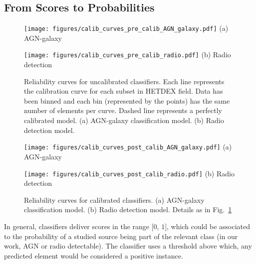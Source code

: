 \documentclass{aa}
\begin{document}
\begin{appendix}
\section{From Scores to Probabilities}\label{app:calibration_models}

\begin{figure}
  \centering
  \begin{minipage}{0.24\textwidth}
    \centering
    \texttt{[image: figures/calib\_curves\_pre\_calib\_AGN\_galaxy.pdf]}\hfill\break%
    {(a) AGN-galaxy}
  \end{minipage}
  \hfill 
  \begin{minipage}{0.24\textwidth}
    \centering
    \texttt{[image: figures/calib\_curves\_pre\_calib\_radio.pdf]}\hfill\break%
    {(b) Radio detection}
  \end{minipage}
  \caption{Reliability curves for uncalibrated classifiers. Each line represents the calibration curve for each subset in HETDEX field. Data has been binned and each bin (represented by the points) has the same number of elements per curve. Dashed line represents a perfectly calibrated model. (a) AGN-galaxy classification model. (b) Radio detection model.}
  \label{fig:calibration_curves_classification_pre}
\end{figure}

\begin{figure}
  \centering
  \begin{minipage}{0.24\textwidth}
    \centering
    \texttt{[image: figures/calib\_curves\_post\_calib\_AGN\_galaxy.pdf]}\hfill\break%
    {(a) AGN-galaxy}
  \end{minipage}
  \hfill 
  \begin{minipage}{0.24\textwidth}
    \centering
    \texttt{[image: figures/calib\_curves\_post\_calib\_radio.pdf]}\hfill\break%
    {(b) Radio detection}
  \end{minipage}
  \caption{Reliability curves for calibrated classifiers. (a) AGN-galaxy classification model. (b) Radio detection model. Details as in Fig.~\ref{fig:calibration_curves_classification_pre}}
  \label{fig:calibration_curves_classification_post}
\end{figure}

In general, classifiers deliver scores in the range [$0$, $1$], which could be associated to the probability of a studied source being part of the relevant class (in our work, AGN or radio detectable). The classifier uses a threshold above which, any predicted element would be considered a positive instance. 


\end{appendix}
\end{document}
